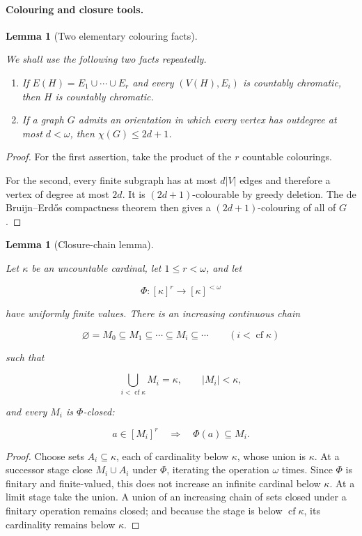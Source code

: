 \documentclass[a4paper,11pt,reqno]{amsart}
\providecommand{\tightlist}{\setlength{\itemsep}{0pt}\setlength{\parskip}{0pt}}
\theoremstyle{plain}
\newtheorem{lemma}[theorem]{Lemma}
\theoremstyle{definition}
\theoremstyle{remark}
\begin{document}
\paragraph{Colouring and closure tools.}\label{colouring-and-closure-tools}

\begin{lemma}[Two elementary colouring facts]\label{lemma-1.3-two-elementary-colouring-facts}

We shall use the following two facts repeatedly.

\begin{enumerate}
\def\labelenumi{\arabic{enumi}.}
\tightlist
\item
  If \(E(H)=E_1\cup\cdots\cup E_r\) and every \((V(H),E_i)\) is countably chromatic, then \(H\) is countably chromatic.
\item
  If a graph \(G\) admits an orientation in which every vertex has outdegree at most \(d<\omega\), then \(\chi(G)\le 2d+1\).
\end{enumerate}

\end{lemma}
\begin{proof}
For the first assertion, take the product of the \(r\) countable colourings.

For the second, every finite subgraph has at most \(d|V|\) edges and therefore a vertex of degree at most \(2d\). It is \((2d+1)\)-colourable by greedy deletion. The de Bruijn--Erdős compactness theorem \citep[Theorem~1]{debruijn1951} then gives a \((2d+1)\)-colouring of all of \(G\).
\end{proof}

\begin{lemma}[Closure-chain lemma]\label{lemma-1.4-closure-chain-lemma}

Let \(\kappa\) be an uncountable cardinal, let \(1\le r<\omega\), and let

\[
\Phi:[\kappa]^r\longrightarrow[\kappa]^{<\omega}
\]

have uniformly finite values. There is an increasing continuous chain

\[
\varnothing=M_0\subseteq M_1\subseteq\cdots
\subseteq M_i\subseteq\cdots\qquad(i<\operatorname{cf}\kappa)
\]

such that

\[
\bigcup_{i<\operatorname{cf}\kappa}M_i=\kappa,
\qquad |M_i|<\kappa,
\]

and every \(M_i\) is \(\Phi\)-closed:

\[
a\in[M_i]^r\quad\Longrightarrow\quad\Phi(a)\subseteq M_i.
\]

\end{lemma}
\begin{proof}
Choose sets \(A_i\subseteq\kappa\), each of cardinality below \(\kappa\), whose union is \(\kappa\). At a successor stage close \(M_i\cup A_i\) under \(\Phi\), iterating the operation \(\omega\) times. Since \(\Phi\) is finitary and finite-valued, this does not increase an infinite cardinal below \(\kappa\). At a limit stage take the union. A union of an increasing chain of sets closed under a finitary operation remains closed; and because the stage is below \(\operatorname{cf}\kappa\), its cardinality remains below \(\kappa\).
\end{proof}
\end{document}
